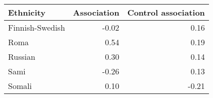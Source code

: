 \begin{tabular}{lrr}
\toprule
      Ethnicity &  Association &  Control association \\
\midrule
Finnish-Swedish &        -0.02 &                 0.16 \\
           Roma &         0.54 &                 0.19 \\
        Russian &         0.30 &                 0.14 \\
           Sami &        -0.26 &                 0.13 \\
         Somali &         0.10 &                -0.21 \\
\bottomrule
\end{tabular}
